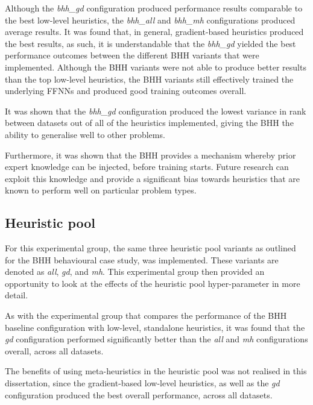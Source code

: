 Although the \textit{bhh\_gd} configuration produced performance results comparable to the best low-level heuristics, the \textit{bhh\_all} and \textit{bhh\_mh} configurations produced average results. It was found that, in general, gradient-based heuristics produced the best results, as such, it is understandable that the \textit{bhh\_gd}  yielded the best performance outcomes between the different \acs{BHH} variants that were implemented. Although the \acs{BHH} variants were not able to produce better results than the top low-level heuristics, the \acs{BHH} variants still effectively trained the underlying \acp{FFNN} and produced good training outcomes overall.

It was shown that the \textit{bhh\_gd} configuration produced the lowest variance in rank between datasets out of all of the heuristics implemented, giving the \acs{BHH} the ability to generalise well to other problems.

Furthermore, it was shown that the \acs{BHH} provides a mechanism whereby prior expert knowledge can be injected, before training starts. Future research can exploit this knowledge and provide a significant bias towards heuristics that are known to perform well on particular problem types.

\subsection{Heuristic pool}
\label{sec:conclusion:results:summary:heuristic_pool}

For this experimental group, the same three heuristic pool variants as outlined for the \acs{BHH} behavioural case study, was implemented. These variants are denoted as \textit{all}, \textit{gd}, and \textit{mh}. This experimental group then provided an opportunity to look at the effects of the heuristic pool hyper-parameter in more detail.

As with the experimental group that compares the performance of the \acs{BHH} baseline configuration with low-level, standalone heuristics, it was found that the \textit{gd} configuration performed significantly better than the \textit{all} and \textit{mh} configurations overall, across all datasets.

The benefits of using meta-heuristics in the heuristic pool was not realised in this dissertation, since the gradient-based low-level heuristics, as well as the \textit{gd} configuration produced the best overall performance, across all datasets.

